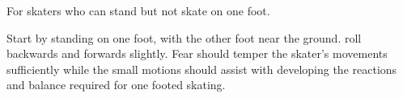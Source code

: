 
For skaters who can stand but not skate on one foot.  

Start by standing on one foot, with the other foot near the ground. roll backwards and forwards slightly. Fear should temper the skater's movements sufficiently while the small motions should assist with developing the reactions and balance required for one footed skating.
